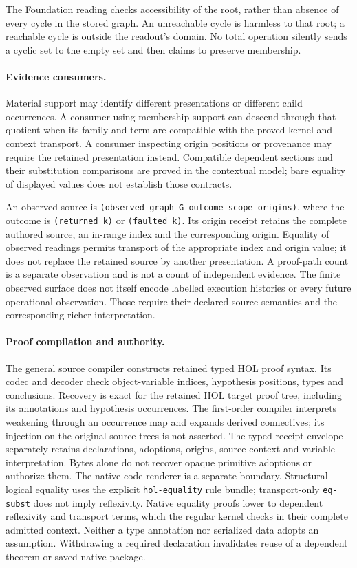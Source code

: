 \documentclass[11pt]{article}
\begin{document}
The Foundation reading checks accessibility of the root, rather than absence
of every cycle in the stored graph. An unreachable cycle is harmless to that
root; a reachable cycle is outside the readout's domain. No total operation
silently sends a cyclic set to the empty set and then claims to preserve
membership.

\paragraph{Evidence consumers.}
Material support may identify different presentations or different child
occurrences. A consumer using membership support can descend through that
quotient when its family and term are compatible with the proved kernel and
context transport. A consumer inspecting origin positions or provenance may
require the retained presentation instead. Compatible dependent sections
and their substitution comparisons are proved in the contextual model;
bare equality of displayed values does not establish those contracts.

An observed source is
\texttt{(observed-graph G outcome scope origins)}, where the outcome is
\texttt{(returned k)} or \texttt{(faulted k)}. Its origin receipt retains
the complete authored source, an in-range index and the corresponding
origin. Equality of observed readings permits transport of the appropriate
index and origin value; it does not replace the retained source by another
presentation. A proof-path count is a separate observation and is not a
count of independent evidence.
The finite observed surface does not itself encode labelled execution
histories or every future operational observation. Those require their
declared source semantics and the corresponding richer interpretation.

\paragraph{Proof compilation and authority.}
The general source compiler constructs retained typed HOL proof syntax.
Its codec and decoder check object-variable indices, hypothesis positions,
types and conclusions. Recovery is exact for the retained HOL target proof
tree, including its annotations and hypothesis occurrences. The first-order
compiler interprets weakening through an occurrence map and expands derived
connectives; its injection on the original source trees is not asserted.
The typed receipt envelope separately retains declarations, adoptions,
origins, source context and variable interpretation. Bytes alone do not
recover opaque primitive adoptions or authorize them. The native code
renderer is a separate boundary. Structural logical equality uses the
explicit \texttt{hol-equality} rule bundle; transport-only
\texttt{eq-subst} does not imply reflexivity. Native equality proofs lower
to dependent reflexivity and transport terms, which the regular kernel
checks in their complete admitted context. Neither a type annotation nor
serialized data adopts an assumption. Withdrawing a required declaration
invalidates reuse of a dependent theorem or saved native package.
\end{document}
